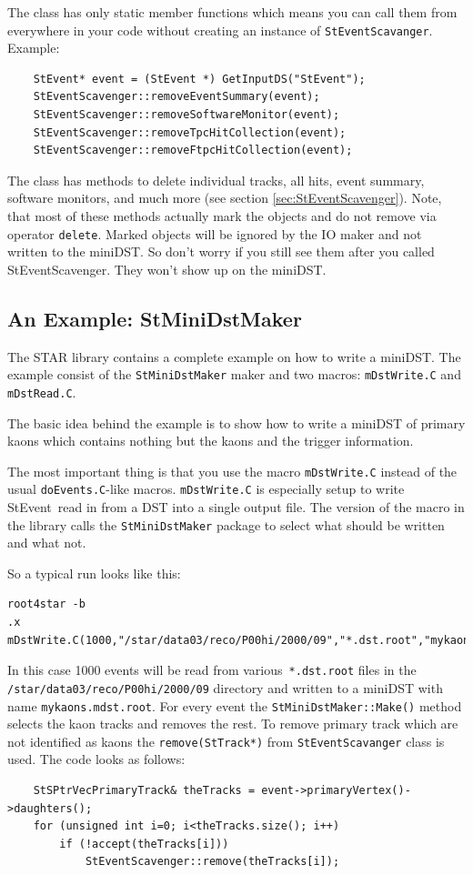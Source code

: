 \documentclass[twoside]{article}
\newcommand{\StEvent}{\textsf{StEvent}}
\begin{document}
The class has only static member functions which means you can call them from
everywhere in your code without creating an instance of \texttt{StEventScavanger}.\\
Example:
\begin{verbatim}
    StEvent* event = (StEvent *) GetInputDS("StEvent");
    StEventScavenger::removeEventSummary(event);
    StEventScavenger::removeSoftwareMonitor(event);
    StEventScavenger::removeTpcHitCollection(event);
    StEventScavenger::removeFtpcHitCollection(event); 
\end{verbatim}
The class has methods to delete individual tracks, all hits, event summary,
software monitors, and much more (see section \ref{sec:StEventScavenger}).
Note, that most of these methods actually mark the objects and do not remove
via operator \texttt{delete}.
Marked objects will be ignored by the IO maker and not written
to the miniDST. So don't worry if you still see them after you called 
StEventScavenger. They won't show up on the miniDST.


\subsection{An Example: StMiniDstMaker}

The STAR library contains a complete example on how to write a miniDST.
The example consist of the \texttt{StMiniDstMaker} maker and two macros:
\texttt{mDstWrite.C} and \texttt{mDstRead.C}.

The basic idea behind the example is to show how to write a miniDST of primary kaons
which contains nothing but the kaons and the trigger information.

The most important thing is that you use the macro \texttt{mDstWrite.C} instead
of the usual \texttt{doEvents.C}-like macros. \texttt{mDstWrite.C} is especially
setup to write \StEvent\ read in from a DST into a single
output file. The version of the macro in the library calls the \texttt{StMiniDstMaker}
package to select what should be written and what not. 

So a typical run looks like this:
\begin{verbatim}
root4star -b
.x mDstWrite.C(1000,"/star/data03/reco/P00hi/2000/09","*.dst.root","mykaons");
\end{verbatim}

In this case 1000 events will be read from various\ \texttt{*.dst.root}
files in the \texttt{/star/data03/reco/P00hi/2000/09} directory and written to
a miniDST with name \texttt{mykaons.mdst.root}.
For every event the \texttt{StMiniDstMaker::Make()} method selects the kaon tracks and removes the
rest. To remove primary track which are not identified as kaons the \texttt{remove(StTrack*)} from
\texttt{StEventScavanger} class is used.
The code looks as follows:
\begin{verbatim}
    StSPtrVecPrimaryTrack& theTracks = event->primaryVertex()->daughters();
    for (unsigned int i=0; i<theTracks.size(); i++)
        if (!accept(theTracks[i]))
            StEventScavenger::remove(theTracks[i]);
\end{verbatim}
\end{document}
